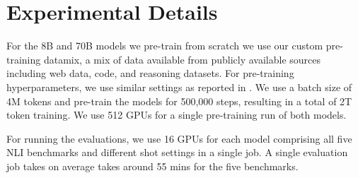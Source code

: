 \section{Experimental Details}
\label{appx:experiments}

For the 8B and 70B models we pre-train from scratch we use our custom pre-training datamix, a mix of data available from publicly available sources including web data, code, and reasoning datasets. For pre-training hyperparameters, we use similar settings as reported in \citet{dubey2024llama}. We use a batch size of 4M tokens and pre-train the models for 500,000 steps, resulting in a total of 2T token training. We use 512 GPUs for a single pre-training run of both models.

For running the evaluations, we use 16 GPUs for each model comprising all five NLI benchmarks and different shot settings in a single job. A single evaluation job takes on average takes around 55 mins for the five benchmarks.
